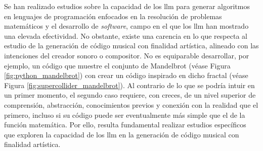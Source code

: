 Se han realizado estudios sobre la capacidad de los \gls{llm} para generar algoritmos en lenguajes de programación enfocados en la resolución de problemas matemáticos y el desarrollo de \emph{software}, campo en el que los \gls{llm} han mostrado una elevada efectividad. No obstante, existe una carencia en lo que respecta al estudio de la generación de código musical con finalidad artística, alineado con las intenciones del creador sonoro o compositor. No es equiparable desarrollar, por ejemplo, un código que muestre el conjunto de Mandelbrot (véase Figura \ref{fig:python_mandelbrot}) con crear un código inspirado en dicho fractal (véase Figura \ref{fig:supercollider_mandelbrot}). Al contrario de lo que se podría intuir en un primer momento, el segundo caso requiere, con creces, de un nivel superior de comprensión, abstracción, conocimientos previos y conexión con la realidad que el primero, incluso si su código puede ser eventualmente más simple que el de la función matemática. Por ello, resulta fundamental realizar estudios específicos que exploren la capacidad de los \gls{llm} en la generación de código musical con finalidad artística.

